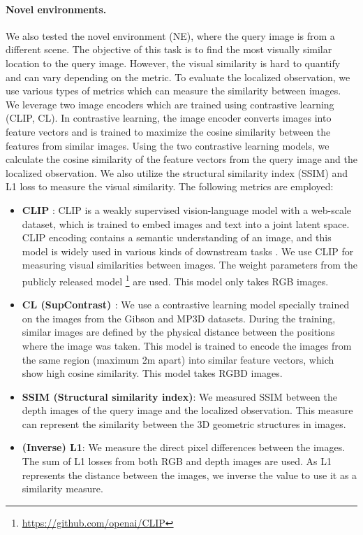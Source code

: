 \documentclass[10pt,twocolumn,letterpaper]{article}
\begin{document}
\paragraph{Novel environments.} 
We also tested the novel environment (NE), where the query image is from a different scene.
%
The objective of this task is to find the most visually similar location to the query image.
%
However, the visual similarity is hard to quantify and can vary depending on the metric.
%
To evaluate the localized observation, we use various types of metrics which can measure the similarity between images.
%
We leverage two image encoders which are trained using contrastive learning (CLIP, CL).
%
In contrastive learning, the image encoder converts images into feature vectors and is trained to maximize the cosine similarity between the features from similar images.
%
Using the two contrastive learning models, we calculate the cosine similarity of the feature vectors from the query image and the localized observation.
%
We also utilize the structural similarity index (SSIM) and L1 loss to measure the visual similarity.
%
The following metrics are employed:
\begin{itemize}
\item \textbf{CLIP} \cite{clip}: CLIP \cite{clip} is a weakly supervised vision-language model with a web-scale dataset, which is trained to embed images and text into a joint latent space. CLIP encoding contains a semantic understanding of an image, and this model is widely used in various kinds of downstream tasks \cite{clip_app_1, clip_app_2, clip_app_3, clip_app_4, clip_app_5, clip_app_6}. We use CLIP for measuring visual similarities between images. The weight parameters from the publicly released model \footnote{\url{https://github.com/openai/CLIP}} are used. This model only takes RGB images.
\item \textbf{CL (SupContrast) \cite{supcontrast}}: We use a contrastive learning model \cite{supcontrast} specially trained on the images from the Gibson \cite{xiazamirhe2018gibsonenv} and MP3D \cite{mp3d} datasets. During the training, similar images are defined by the physical distance between the positions where the image was taken. This model is trained to encode the images from the same region (maximum 2m apart) into similar feature vectors, which show high cosine similarity. This model takes RGBD images. 
\item \textbf{SSIM \cite{ssim} (Structural similarity index)}: We measured SSIM between the depth images of the query image and the localized observation. This measure can represent the similarity between the 3D geometric structures in images.
\item \textbf{(Inverse) L1}: We measure the direct pixel differences between the images. The sum of L1 losses from both RGB and depth images are used. As L1 represents the distance between the images, we inverse the value to use it as a similarity measure. 
\end{itemize}
\end{document}

